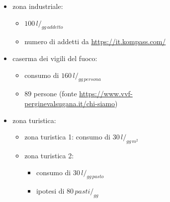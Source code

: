 \documentclass{beamer}
\begin{document}
{\begin{frame}[allowframebreaks]
\begin{columns}
\begin{column}{.45\textwidth}
\begin{figure}
   \end{figure}
  \end{column}
%
  \begin{column}{0.55\textwidth}
   \begin{itemize}
    \item zona industriale:
    \begin{itemize}
     \item $100\,l/_{gg\,addetto}$
     \item numero di addetti da \url{https://it.kompass.com/}
    \end{itemize}
    \item caserma dei vigili del fuoco: 
    \begin{itemize}
     \item consumo di $160\,l/_{gg\,persona}$
     \item $89$ persone (fonte \url{https://www.vvf-perginevalsugana.it/chi-siamo})
    \end{itemize}
    \item zona turistica:
    \begin{itemize}
     \item zona turistica 1: consumo di $30\,l/_{gg\,m^2}$
     \item zona turistica 2:
     \begin{itemize}
      \item consumo di $30\,l/_{gg\,pasto}$
      \item ipotesi di $80\,pasti/_{gg}$
     \end{itemize}
    \end{itemize}
   \end{itemize}
  \end{column}
 \end{columns}

\end{frame}}
\end{document}
